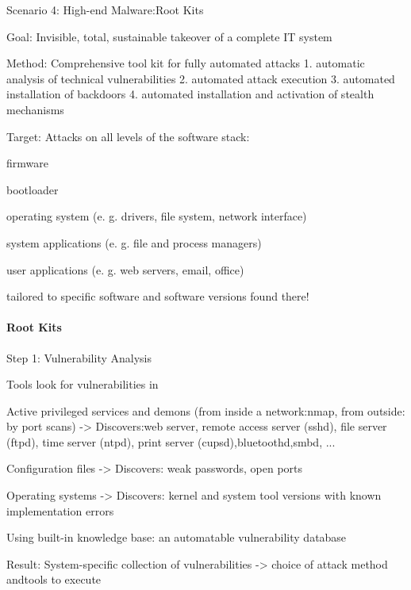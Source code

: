\documentclass[a4paper]{article}
\begin{document}
\begin{multicols}{3}
    Scenario 4: High-end Malware:Root Kits
    \begin{itemize*}
        \item Goal: Invisible, total, sustainable takeover of a complete IT system
        \item Method: Comprehensive tool kit for fully automated attacks
              1. automatic analysis of technical vulnerabilities
              2. automated attack execution
              3. automated installation of backdoors
              4. automated installation and activation of stealth mechanisms
        \item Target: Attacks on all levels of the software stack:
              \begin{itemize*}
                  \item firmware
                  \item bootloader
                  \item operating system (e. g. drivers, file system, network interface)
                  \item system applications (e. g. file and process managers)
                  \item user applications (e. g. web servers, email, office)
              \end{itemize*}
        \item tailored to specific software and software versions found there!
    \end{itemize*}

    \paragraph{Root Kits}
    Step 1: Vulnerability Analysis
    \begin{itemize*}
        \item Tools look for vulnerabilities in
              \begin{itemize*}
                  \item Active privileged services and demons (from inside a network:nmap, from outside: by port scans) -> Discovers:web server, remote access server (sshd), file server (ftpd), time server (ntpd), print server (cupsd),bluetoothd,smbd, ...
                  \item Configuration files -> Discovers: weak passwords, open ports
                  \item Operating systems -> Discovers: kernel and system tool versions with known implementation errors
              \end{itemize*}
        \item Using built-in knowledge base: an automatable vulnerability database
        \item Result: System-specific collection of vulnerabilities ->  choice of attack method andtools to execute
    \end{itemize*}


\end{multicols}
\end{document}
